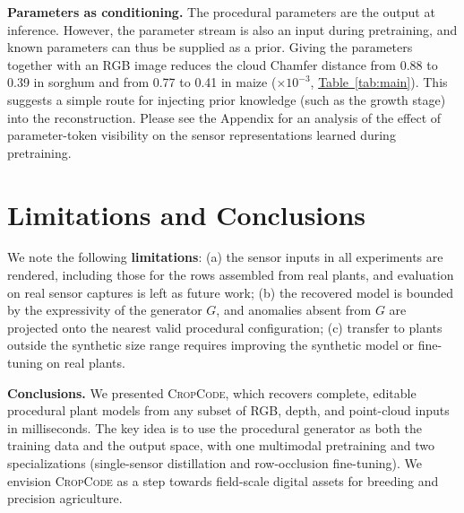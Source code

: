\documentclass[10pt,twocolumn,letterpaper]{article}
\newcommand{\tabref}[1]{\hyperref[#1]{Table~\ref*{#1}}}
\newcommand{\appendixref}[1]{\hyperref[#1]{Appendix~\ref*{#1}}}
\newcommand{\method}{\textup{\textsc{CropCode}}}   %
\begin{document}
\noindent\textbf{Parameters as conditioning.}
The procedural parameters are the output at inference. However, the parameter stream is also an input during pretraining, and known parameters can thus be supplied as a prior. Giving the parameters together with an RGB image reduces the cloud Chamfer distance from 0.88 to 0.39 in sorghum and from 0.77 to 0.41 in maize ($\times 10^{-3}$, \tabref{tab:main}). This suggests a simple route for injecting prior knowledge (such as the growth stage) into the reconstruction.
Please see the Appendix for an analysis of the effect of parameter-token visibility on the sensor representations learned during pretraining.

\section{Limitations and Conclusions}
\label{sec:discussion}\label{sec:conclusion}

We note the following \noindent\textbf{limitations}: (a) the sensor inputs in all experiments are rendered, including those for the rows assembled from real plants, and evaluation on real sensor captures is left as future work; (b) the recovered model is bounded by the expressivity of the generator $G$, and anomalies absent from $G$ are projected onto the nearest valid procedural configuration; (c) transfer to plants outside the synthetic size range requires improving the synthetic model or fine-tuning on real plants. %
%

\noindent\textbf{Conclusions.}
We presented \method{}, which recovers complete, editable procedural plant models from any subset of RGB, depth, and point-cloud inputs in milliseconds. The key idea is to use the procedural generator as both the training data and the output space, with one multimodal pretraining and two specializations (single-sensor distillation and row-occlusion fine-tuning). We envision \method{} as a step towards field-scale digital assets for breeding and precision agriculture.
\end{document}
